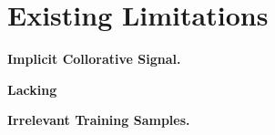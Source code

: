 \section{Existing Limitations}


\noindent \textbf{Implicit Collorative Signal.}


\noindent \textbf{Lacking}




\noindent \textbf{Irrelevant Training Samples.}